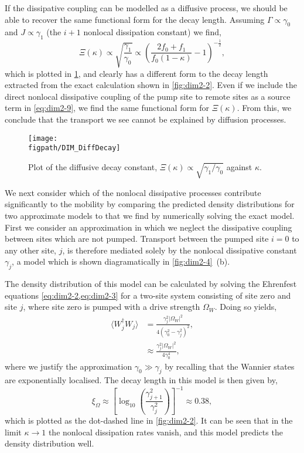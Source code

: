 If the dissipative coupling can be modelled as a diffusive process, we should be able to recover the same functional form for the decay length. Assuming \(\Gamma \propto \gamma_{0}\) and \(J \propto \gamma_{1}\) (the \(i+1\) nonlocal dissipation constant) we find,
\begin{equation}
	\Xi(\kappa) \propto \sqrt{\frac{\gamma_{1}}{\gamma_{0}}} \propto \left(\frac{2f_{0} + f_{1}}{f_{0}(1-\kappa)} - 1\right)^{-\frac{1}{2}},
	\label{eq:dim2-11}
\end{equation}
which is plotted in \cref{fig:dim2-5}, and clearly has a different form to the decay length extracted from the exact calculation shown in \cref{fig:dim2-2}. Even if we include the direct nonlocal dissipative coupling of the pump site to remote sites as a source term in \cref{eq:dim2-9}, we find the same functional form for \(\Xi(\kappa)\). From this, we conclude that the transport we see cannot be explained by diffusion processes.

\begin{figure}[ht!]
\centering 
\texttt{[image: \\figpath/DIM\_DiffDecay]}
\caption{\label{fig:dim2-5}Plot of the diffusive decay constant, \(\Xi(\kappa) \propto \sqrt{\gamma_{1}/\gamma_{0}}\) against \(\kappa\).}
\end{figure}

We next consider which of the nonlocal dissipative processes contribute significantly to the mobility by comparing the predicted density distributions for two approximate models to that we find by numerically solving the exact model. First we consider an approximation in which we neglect the dissipative coupling between sites which are not pumped. Transport between the pumped site \(i=0\) to any other site, \(j\), is therefore mediated solely by the nonlocal dissipative constant \(\gamma_{j}\), a model which is shown diagramatically in \cref{fig:dim2-4}~(b). 

The density distribution of this model can be calculated by solving the Ehrenfest equations \cref{eq:dim2-2,eq:dim2-3} for a two-site system consisting of site zero and site \(j\), where site zero is pumped with a drive strength \(\Omega_{W}\). Doing so yields,
\begin{align}
	\langle W_{j}^{\dagger}W_{j} \rangle &= \frac{\gamma_{j}^{2}|\Omega_{W}|^{2}}{4(\gamma_{0}^{2} - \gamma_{j}^{2})^{2}}, \label{eq:dim2-12} \\
	&\approx \frac{\gamma_{j}^{2}|\Omega_{W}|^{2}}{4\gamma_{0}^{4}}, \label{eq:dim2-13}
\end{align}
where we justify the approximation \(\gamma_{0} \gg \gamma_{j}\) by recalling that the Wannier states are exponentially localised. The decay length in this model is then given by,
\begin{equation}
	\xi_{\Omega} \approx \left[ \log_{10}\left(\frac{\gamma_{j+1}^{2}}{\gamma_{j}^{2}}\right)\right]^{-1} \approx 0.38,
	\label{eq:dim2-14}
\end{equation}
which is plotted as the dot-dashed line in \cref{fig:dim2-2}. It can be seen that in the limit \(\kappa \rightarrow 1\) the nonlocal dissipation rates vanish, and this model predicts the density distribution well.

